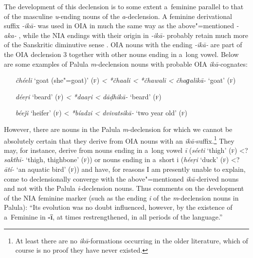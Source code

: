 The development of this declension is to some extent a~feminine parallel to that of the masculine \textit{u}-ending nouns of the \textit{a}-declension. A feminine derivational suffix \textit{-ikā-} was used in OIA in much the same way as the above"=mentioned \textit{-aka-} \citep[1222]{whitney1960}, while the NIA endings with their origin in \textit{-ikā-} probably retain much more of the Sanskritic diminutive sense \citep[222]{masica1991}. OIA nouns with the ending \textit{-ikā-} are part of the OIA declension 3 together with other nouns ending in a~long vowel. Below are some examples of Palula \textit{m}-declension nouns with probable OIA \textit{ikā}-cognates: 


\begin{itemize}[leftmargin=]
\item[\textit{čhéeli} `goat (she"=goat)' (\textsc{f})] \textit{{\textless} *čhaali {\textless} *čhawali {\textless} čhaɡalikā-} `goat' (\textsc{f})
\item[\textit{déeṛi} `beard' (\textsc{f})] \textit{{\textless} *daaṛi {\textless} dāḍhikā-} `beard' (\textsc{f})
\item[\textit{béeǰi} `heifer' (\textsc{f})] {\textless} \textit{*bíadzi {\textless} dvivatsikā-} `two year old' (\textsc{f})
\end{itemize}

However, there are nouns in the Palula \textit{m}-declension for which we cannot be absolutely
certain that they derive from OIA nouns with an \textit{ikā-}suffix.\footnote{At least there are
  no \textit{ikā}-formations occurring in the older literature, which of course is no proof
  they have never existed.} They may, for instance, derive from nouns ending in a~long vowel
\textit{ī} (\textit{séeti} `thigh' (\textsc{f}) {\textless}? \textit{sakthī-} `thigh, thighbone' (\textsc{f})) or nouns ending in a~short i (\textit{héeṛi} `duck'
(\textsc{f}) {\textless}? \textit{ātí-} `an aquatic bird' (\textsc{f})) and have, for
reasons I am presently unable to explain, come to declensionally converge with the above"=mentioned
\textit{ikā-}derived nouns and not with the Palula \textit{i}-declension nouns. Thus
\citet[222]{masica1991} comments on the development of the NIA feminine marker (such as the ending
\textit{i} of the \textit{m}-declension nouns in Palula): ``Its evolution was no doubt influenced,
however, by the existence of a~Feminine in \textbf{-ī}, at times
restrengthened, in all periods of the language.''


